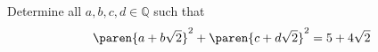 Determine all $a, b, c, d \in \mathbb{Q}$ such that
\begin{equation*}
  \paren{a + b \sqrt{2}}^2 + \paren{c + d \sqrt{2}}^2 = 5 + 4 \sqrt{2}
\end{equation*}
